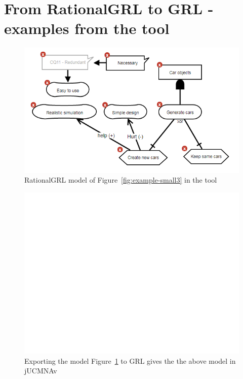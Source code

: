 \section{From RationalGRL to GRL - examples from the tool}
\label{sect:tool-screenshots}

\begin{figure}[ht]
\centering
\includegraphics[scale=0.8]{img/tool/model1a}
\caption{RationalGRL model of Figure~\ref{fig:example-small3} in the tool}
\label{fig:tool:figfrompaper}
\end{figure}

\begin{figure}[ht]
\centering
\includegraphics[scale=0.6]{img/tool/GRLmodel1a}
\caption{Exporting the model Figure~\ref{fig:tool:figfrompaper} to GRL gives the the above model in jUCMNAv}
\label{fig:tool:figfrompaper1}
\end{figure}

